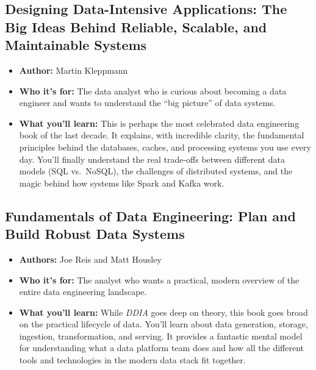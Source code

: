 \documentclass[
  letterpaper,
  DIV=11,
  numbers=noendperiod]{scrreprt}
\providecommand{\tightlist}{%
  \setlength{\itemsep}{0pt}\setlength{\parskip}{0pt}}
\begin{document}
\subsection{\texorpdfstring{\textbf{Designing Data-Intensive
Applications: The Big Ideas Behind Reliable, Scalable, and Maintainable
Systems}}{Designing Data-Intensive Applications: The Big Ideas Behind Reliable, Scalable, and Maintainable Systems}}\label{designing-data-intensive-applications-the-big-ideas-behind-reliable-scalable-and-maintainable-systems}

\begin{itemize}
\tightlist
\item
  \textbf{Author:} Martin Kleppmann
\item
  \textbf{Who it's for:} The data analyst who is curious about becoming
  a data engineer and wants to understand the ``big picture'' of data
  systems.
\item
  \textbf{What you'll learn:} This is perhaps the most celebrated data
  engineering book of the last decade. It explains, with incredible
  clarity, the fundamental principles behind the databases, caches, and
  processing systems you use every day. You'll finally understand the
  real trade-offs between different data models (SQL vs.~NoSQL), the
  challenges of distributed systems, and the magic behind how systems
  like Spark and Kafka work.
\end{itemize}

\subsection{\texorpdfstring{\textbf{Fundamentals of Data Engineering:
Plan and Build Robust Data
Systems}}{Fundamentals of Data Engineering: Plan and Build Robust Data Systems}}\label{fundamentals-of-data-engineering-plan-and-build-robust-data-systems}

\begin{itemize}
\tightlist
\item
  \textbf{Authors:} Joe Reis and Matt Housley
\item
  \textbf{Who it's for:} The analyst who wants a practical, modern
  overview of the entire data engineering landscape.
\item
  \textbf{What you'll learn:} While \emph{DDIA} goes deep on theory,
  this book goes broad on the practical lifecycle of data. You'll learn
  about data generation, storage, ingestion, transformation, and
  serving. It provides a fantastic mental model for understanding what a
  data platform team does and how all the different tools and
  technologies in the modern data stack fit together.
\end{itemize}
\end{document}

